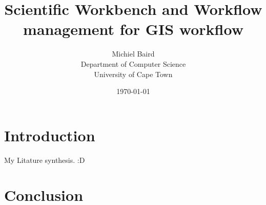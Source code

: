 \documentclass[12pt,twocolumn]{article}
\title{Scientific Workbench and Workflow management for GIS workflow}
\author{
    Michiel Baird \\
        Department of Computer Science \\
        University of Cape Town
}
\date{\today}
\begin{document}
\maketitle
\section{Introduction}
    My Litature synthesis. :D \cite{Shegalov:2001:XWM:767132.767139}
\section{Conclusion}


{}

\end{document}
